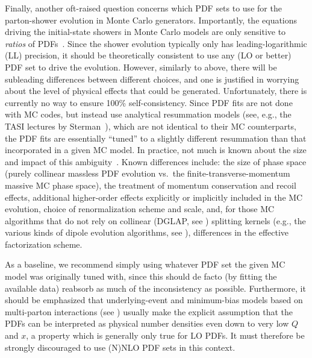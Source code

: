 %
%
%
Finally, another oft-raised question concerns which PDF sets to use for the
  parton-shower evolution in Monte Carlo
  generators. Importantly, the equations driving the 
initial-state showers in Monte Carlo models are only sensitive to 
\emph{ratios} of PDFs~\cite{Bengtsson:1986gz}. Since the shower
  evolution typically 
  only has leading-logarithmic (LL) precision, it should be
  theoretically consistent to use any (LO or better) 
PDF set to drive the
  evolution. However, similarly to above, there will be subleading
  differences between different choices, and one is justified in
  worrying about the level of physical effects that could be generated. 
Unfortunately, there is 
  currently no way to ensure 100\% self-consistency. 
  Since PDF fits are not done with MC codes, but
  instead use analytical resummation models (see, e.g., the TASI
  lectures by Sterman~\cite{Sterman:1995fz}), which are not identical to
  their MC counterparts, the PDF fits are essentially ``tuned'' to a
  slightly different resummation than that incorporated in a given MC
  model. In practice, not much is known about the size and impact
  of this ambiguity~\cite{Gieseke:2004tc}. Known differences include: 
  the size of phase space (purely collinear massless PDF evolution
  vs.\ the finite-transverse-momentum massive  MC phase space),  
  the treatment of momentum conservation and recoil effects,
  additional higher-order effects explicitly or implicitly included in
  the MC evolution, choice of renormalization scheme
  and scale, and, for those MC algorithms that do not rely on
  collinear (DGLAP, see \cite{Dissertori:2003pj}) 
  splitting kernels (e.g., the various kinds of dipole
  evolution algorithms, see \cite{Bern:2008ef}), differences in the
  effective factorization 
  scheme. 

As a baseline, we recommend simply using whatever PDF set the given MC
  model was originally tuned with, since this should de facto  (by
  fitting the available 
  data) reabsorb as much of the inconsistency as
  possible. Furthermore, it should be emphasized that underlying-event
  and minimum-bias models 
  based on multi-parton interactions
  (see ) usually make the explicit
  assumption 
that 
  the PDFs can be interpreted as physical number densities even 
  down to very low $Q$ and $x$, a property which is generally 
  only true for LO PDFs. It must therefore be strongly discouraged to use 
  (N)NLO PDF sets in this context. 

